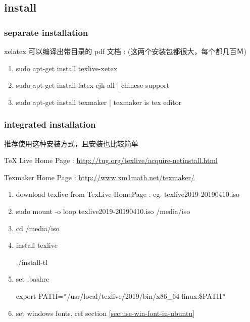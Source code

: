 
\subsection{install}

\subsubsection{separate installation}

xelatex 可以编译出带目录的 pdf 文档 : (这两个安装包都很大，每个都几百Ｍ)

\begin{enumerate}[topsep=0pt,itemsep=0pt,parsep=0pt,leftmargin=3.6em,label=\arabic*>]
    \item sudo apt-get install texlive-xetex
    \item sudo apt-get install latex-cjk-all | chinese support
    \item sudo apt-get install texmaker | texmaker is tex editor
\end{enumerate}

\subsubsection{integrated installation}

推荐使用这种安装方式，且安装也比较简单

TeX Live Home Page : \url{http://tug.org/texlive/acquire-netinstall.html}

Texmaker Home Page : \url{http://www.xm1math.net/texmaker/}

\begin{enumerate}[topsep=0pt,itemsep=0pt,parsep=0pt,leftmargin=3.6em,label=\arabic*>]
    \item download texlive from TexLive HomePage : eg. texlive2019-20190410.iso
    \item sudo mount -o loop texlive2019-20190410.iso /media/iso
    \item cd /media/iso
    \item install texlive \par
        {\color{DefinedColorGreen}./install-tl}
    \item set .bashrc \par
        {\color{violet}export PATH=\verb!"!/usr/local/texlive/2019/bin/x86\_64-linux:\$PATH\verb!"!}
    \item set windows fonts, ref section \ref{sec:use-win-font-in-ubuntu}
\end{enumerate}

